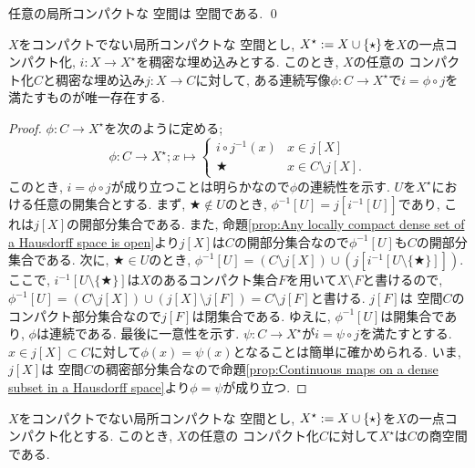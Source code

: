 \documentclass[uplatex, dvipdfmx, a4paper, 12pt, class=jsbook, crop=false]{standalone}
\begin{document}
\begin{corollary}
	任意の局所コンパクトな \Hausdorff 空間は  空間である. \qed
\end{corollary}

\begin{proposition}
	\label{prop:Universality of one-point compactification}
	$ X $をコンパクトでない局所コンパクトな \Hausdorff 空間とし, $ X^\star \mathrel{:=} X \cup \{\star\} $を$ X $の一点コンパクト化, $ i \colon X \to X^\star $を稠密な埋め込みとする. このとき, $ X $の任意の \Hausdorff コンパクト化$ C $と稠密な埋め込み$ j \colon X \to C $に対して, ある連続写像$ \phi \colon C \to X^\star $で$ i = \phi \circ j $を満たすものが唯一存在する.
\end{proposition}

\begin{proof}
	$ \phi \colon C \to X^\star $を次のように定める;
	$$ \phi \colon C \to X^\star \semicolon x \mapsto \begin{cases}
	i\circ j^{-1}(x) & x \in j[X] \\
	\bigstar & x \in C \setminus j[X].
	\end{cases}$$
	このとき, $ i = \phi \circ j $が成り立つことは明らかなので$ \phi $の連続性を示す. $ U $を$ X^\star $における任意の開集合とする. まず, $ \bigstar \notin U $のとき, $ \phi^{-1}[U] = j[i^{-1}[U]] $であり, これは$ j[X] $の開部分集合である. また, 命題\ref{prop:Any locally compact dense set of a Hausdorff space is open}より$ j[X] $は$ C $の開部分集合なので$ \phi^{-1}[U] $も$ C $の開部分集合である. 次に, $ \bigstar \in U $のとき, $ \phi^{-1}[U] = (C \setminus j[X]) \cup (j[i^{-1}[U \setminus \{\bigstar\}]]) $. ここで, $ i^{-1}[U \setminus \{\bigstar\}] $は$ X $のあるコンパクト集合$ F $を用いて$ X \setminus F $と書けるので, $ \phi^{-1}[U] = (C \setminus j[X]) \cup (j[X] \setminus j[F]) = C \setminus j[F] $と書ける. $ j[F] $は \Hausdorff 空間$ C $のコンパクト部分集合なので$ j[F] $は閉集合である. ゆえに, $ \phi^{-1}[U] $は開集合であり, $ \phi $は連続である. 最後に一意性を示す. $ \psi \colon  C \to X^\star $が$ i = \psi \circ j $を満たすとする. $ x \in j[X] \subset C $に対して$ \phi(x) = \psi(x) $となることは簡単に確かめられる. いま, $ j[X] $は \Hausdorff 空間$ C $の稠密部分集合なので命題\ref{prop:Continuous maps on a dense subset in a Hausdorff space}より$ \phi = \psi $が成り立つ.
\end{proof}

\begin{proposition}
	$ X $をコンパクトでない局所コンパクトな \Hausdorff 空間とし, $ X^\star \mathrel{:=} X \cup \{\star\} $を$ X $の一点コンパクト化とする. このとき, $ X $の任意の \Hausdorff コンパクト化$ C $に対して$ X^\star $は$ C $の商空間である.
\end{proposition}
\end{document}
